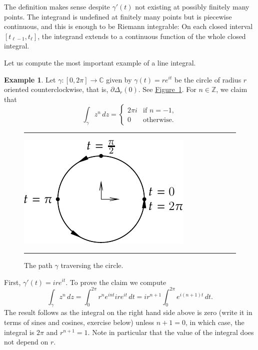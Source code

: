 \documentclass[12pt,openany]{book}
\newcommand{\C}{{\mathbb{C}}}
\newcommand{\Z}{{\mathbb{Z}}}
\theoremstyle{plain}
\theoremstyle{remark}
\theoremstyle{definition}
\newenvironment{myfig}{%
\begin{figure}[h!t]
\noindent\rule{\textwidth}{0.4pt}\vspace{12pt}\par\centering}%
{\par\noindent\rule{\textwidth}{0.4pt}
\end{figure}}
\theoremstyle{exercise}
\theoremstyle{example}
\newtheorem{example}[thm]{Example}
\newcommand{\figureref}[1]{\hyperref[#1]{Figure~\ref*{#1}}}
\begin{document}
The definition makes sense despite $\gamma'(t)$ not existing at possibly
finitely many points.  The integrand is undefined
at finitely many points but is piecewise continuous, and this is enough
to be Riemann integrable: On each closed interval
$[t_{\ell-1},t_\ell]$, the integrand extends to a continuous
function of the whole closed integral.

Let us compute the most important example of a line integral.

\begin{example} \label{example:integralpowerz}
Let $\gamma \colon [0,2\pi] \to \C$ given by $\gamma(t) = r e^{it}$ be
the circle of radius $r$ oriented counterclockwise,
that is, $\partial \Delta_r(0)$.  See \figureref{fig:circlepath}.
For $n \in \Z$, we claim that
\begin{equation*}
\int_\gamma z^n \, dz
=
\begin{cases}
2\pi i & \text{if } n=-1, \\
0 & \text{otherwise.}
\end{cases}
\end{equation*}

\begin{myfig}
\includegraphics{figures/circlepath}
\caption{The path $\gamma$ traversing the circle.\label{fig:circlepath}}
\end{myfig}

First, $\gamma'(t) = i r e^{it}$.
To prove the claim we compute
\begin{equation*}
\int_\gamma z^n \, dz
=
\int_0^{2\pi}
r^n
e^{int} i r e^{it} \, dt
=
i r^{n+1}
\int_0^{2\pi}
e^{i(n+1)t} \, dt .
\end{equation*}
The result follows as the integral on the right hand side above is zero
(write it in terms of sines and cosines, exercise below) unless $n+1 = 0$,
in which case, the integral 
is $2\pi$ and $r^{n+1} = 1$.  Note in particular that the value of the
integral does not depend on $r$.
\end{example}
\end{document}
